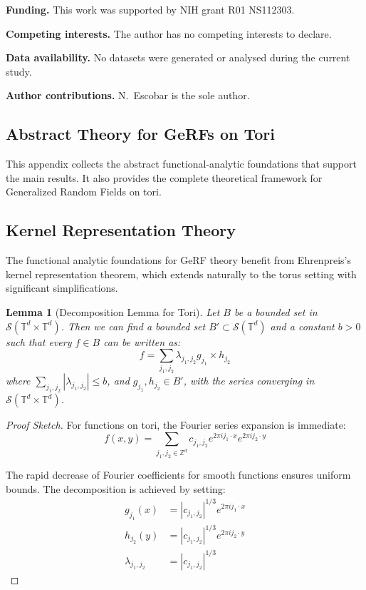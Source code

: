 \documentclass[pdflatex,sn-mathphys,Numbered]{sn-jnl}
\theoremstyle{thmstyleone}%
\newtheorem{lemma}[theorem]{Lemma}%
\theoremstyle{thmstyletwo}%
\theoremstyle{thmstylethree}%
\newcommand{\ZZ}{\mathbb{Z}}
\newcommand{\TT}{\mathbb{T}}
\newcommand{\calS}{\mathcal{S}}
\begin{document}
\noindent\textbf{Funding.} This work was supported by NIH grant R01 NS112303.

\medskip
\noindent\textbf{Competing interests.} The author has no competing interests to
declare.

\medskip
\noindent\textbf{Data availability.} No datasets were generated or analysed during the current study.

\medskip
\noindent\textbf{Author contributions.} N.\ Escobar is the sole author.

\begin{appendices}
\section{Abstract Theory for GeRFs on Tori}
\label{sec:appendix}

This appendix collects the abstract functional-analytic foundations that support
the main results. It also provides the complete theoretical framework
for Generalized Random Fields on tori.

\subsection{Kernel Representation Theory}

The functional analytic foundations for GeRF theory benefit from Ehrenpreis's
kernel representation theorem, which extends naturally to the torus setting with
significant simplifications.

\begin{lemma}[Decomposition Lemma for Tori]
Let $B$ be a bounded set in $\calS(\TT^d \times \TT^d)$. Then we can find a bounded set $B' \subset \calS(\TT^d)$ and a constant $b > 0$ such that every $f \in B$ can be written as:
$$f = \sum_{j_1,j_2} \lambda_{j_1,j_2} g_{j_1} \times h_{j_2}$$
where $\sum_{j_1,j_2} |\lambda_{j_1,j_2}| \leq b$, and $g_{j_1}, h_{j_2} \in B'$, with the series converging in $\calS(\TT^d \times \TT^d)$.
\end{lemma}

\begin{proof}[Proof Sketch]
For functions on tori, the Fourier series expansion is immediate:
$$f(x,y) = \sum_{j_1,j_2 \in \ZZ^d} c_{j_1,j_2} e^{2\pi i j_1 \cdot x} e^{2\pi i j_2 \cdot y}$$

The rapid decrease of Fourier coefficients for smooth functions ensures uniform bounds. The decomposition is achieved by setting:
\begin{align}
g_{j_1}(x) &= |c_{j_1,j_2}|^{1/3} e^{2\pi i j_1 \cdot x}\\
h_{j_2}(y) &= |c_{j_1,j_2}|^{1/3} e^{2\pi i j_2 \cdot y}\\
\lambda_{j_1,j_2} &= |c_{j_1,j_2}|^{1/3}
\end{align}
\end{proof}


\end{appendices}
\end{document}
